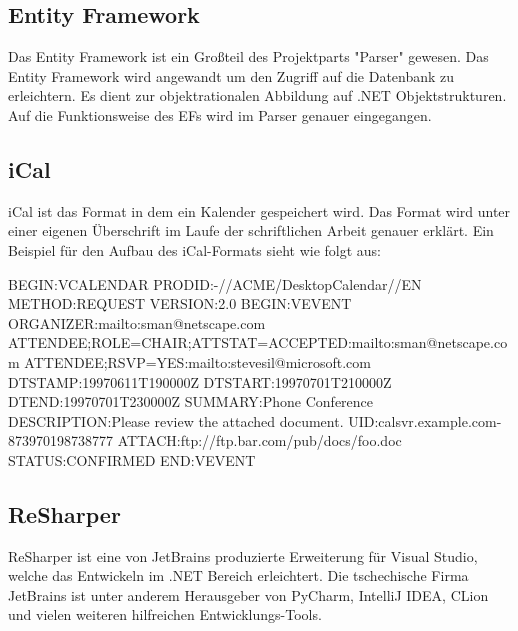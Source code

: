 \subsection {Entity Framework}
\label{sec:VisualStudio17Community}
Das Entity Framework ist ein Großteil des Projektparts "Parser" gewesen. Das Entity Framework wird angewandt um den Zugriff auf die Datenbank zu erleichtern. Es dient zur objektrationalen Abbildung auf .NET Objektstrukturen. Auf die Funktionsweise des EFs wird im Parser genauer eingegangen.
\subsection {iCal}
\label{sec:VisualStudio17Community}
iCal ist das Format in dem ein Kalender gespeichert wird. Das Format wird unter einer eigenen Überschrift im Laufe der schriftlichen Arbeit genauer erklärt. 
Ein Beispiel für den Aufbau des iCal-Formats sieht wie folgt aus: 
\begin{flushleft}
BEGIN:VCALENDAR \break
   PRODID:-//ACME/DesktopCalendar//EN \break
   METHOD:REQUEST \break
   VERSION:2.0 \break
   BEGIN:VEVENT \break
   ORGANIZER:mailto:sman@netscape.com \break
   ATTENDEE;ROLE=CHAIR;ATTSTAT=ACCEPTED:mailto:sman@netscape.com \break
   ATTENDEE;RSVP=YES:mailto:stevesil@microsoft.com \break
   DTSTAMP:19970611T190000Z \break
   DTSTART:19970701T210000Z \break
   DTEND:19970701T230000Z \break
   SUMMARY:Phone Conference \break
   DESCRIPTION:Please review the attached document. \break
   UID:calsvr.example.com-873970198738777 \break
   ATTACH:ftp://ftp.bar.com/pub/docs/foo.doc \break
   STATUS:CONFIRMED \break
   END:VEVENT
\end{flushleft}
\cite{TechnologieiCalExample}
\subsection {ReSharper}
\label{sec:VisualStudio17Community}
ReSharper ist eine von JetBrains produzierte Erweiterung für Visual Studio, welche das Entwickeln im .NET Bereich erleichtert. Die tschechische Firma JetBrains ist unter anderem Herausgeber von PyCharm, IntelliJ IDEA,  CLion und vielen weiteren hilfreichen Entwicklungs-Tools.
